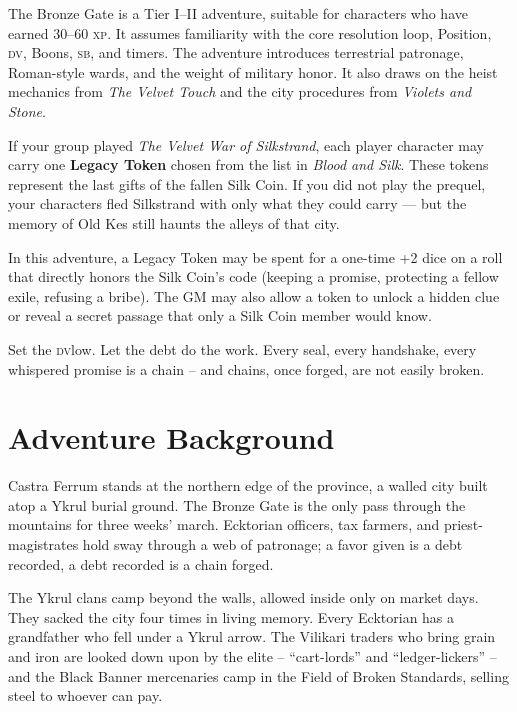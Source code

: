 \documentclass[10pt,twoside]{book}
\newcommand{\sb}{\textsc{sb}}
\newcommand{\dv}{\textsc{dv}}
\newcommand{\xp}{\textsc{xp}}
\begin{document}
The Bronze Gate is a Tier I--II adventure, suitable for characters who have earned 30--60 \xp. It assumes familiarity with the core resolution loop, Position, \dv, Boons, \sb, and timers. The adventure introduces terrestrial patronage, Roman-style wards, and the weight of military honor. It also draws on the heist mechanics from \textit{The Velvet Touch} and the city procedures from \textit{Violets and Stone}.

\begin{sidebar}
If your group played \textit{The Velvet War of Silkstrand}, each player character may carry one \textbf{Legacy Token} chosen from the list in \textit{Blood and Silk}. These tokens represent the last gifts of the fallen Silk Coin. If you did not play the prequel, your characters fled Silkstrand with only what they could carry --- but the memory of Old Kes still haunts the alleys of that city.

In this adventure, a Legacy Token may be spent for a one-time +2 dice on a roll that directly honors the Silk Coin's code (keeping a promise, protecting a fellow exile, refusing a bribe). The GM may also allow a token to unlock a hidden clue or reveal a secret passage that only a Silk Coin member would know.
\end{sidebar}

\begin{sidebar}
Set the \dv low. Let the debt do the work. Every seal, every handshake, every whispered promise is a chain -- and chains, once forged, are not easily broken.
\end{sidebar}

\section{Adventure Background}

Castra Ferrum stands at the northern edge of the province, a walled city built atop a Ykrul burial ground. The Bronze Gate is the only pass through the mountains for three weeks' march. Ecktorian officers, tax farmers, and priest-magistrates hold sway through a web of patronage; a favor given is a debt recorded, a debt recorded is a chain forged.

The Ykrul clans camp beyond the walls, allowed inside only on market days. They sacked the city four times in living memory. Every Ecktorian has a grandfather who fell under a Ykrul arrow. The Vilikari traders who bring grain and iron are looked down upon by the elite -- ``cart-lords'' and ``ledger-lickers'' -- and the Black Banner mercenaries camp in the Field of Broken Standards, selling steel to whoever can pay.
\end{document}
